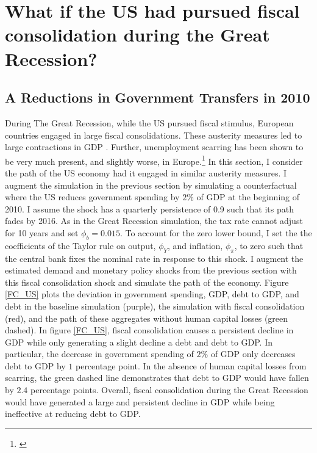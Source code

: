 \section{What if the US had pursued fiscal consolidation during the Great Recession?}


\subsection{A Reductions in Government Transfers in 2010}

During The Great Recession, while the US pursued fiscal stimulus, European countries engaged in large fiscal consolidations. These austerity measures led to large contractions in GDP \citep{Jorda2016,FATAS2018,House2020}. Further, unemployment scarring has been shown to be very much present, and slightly worse, in Europe.\footnote{\cite{Bertheau2023} } In this section, I consider the path of the US economy had it engaged in similar austerity measures. I augment the simulation in the previous section by simulating a counterfactual where the US reduces government spending by $2\%$ of GDP at the beginning of 2010. I assume the shock has a quarterly persistence of 0.9 such that its path fades by 2016. As in the Great Recession simulation, the tax rate cannot adjust for 10 years and set $\phi_{b}=0.015$. To account for the zero lower bound, I set the the coefficients of the Taylor rule on output, $\phi_{Y}$, and inflation, $\phi_{\pi}$, to zero such that the central bank fixes the nominal rate in response to this shock. I augment the estimated demand and monetary policy shocks from the previous section with this fiscal consolidation shock and simulate the path of the economy. Figure \ref{FC_US} plots the deviation in government spending, GDP, debt to GDP, and debt in the baseline simulation (purple), the simulation with fiscal consolidation (red), and the path of these aggregates without human capital losses (green dashed). In figure \ref{FC_US}, fiscal consolidation causes a persistent decline in GDP while only generating a slight decline a debt and debt to GDP. In particular, the decrease in government spending of  $2\%$ of GDP only decreases debt to GDP by $1$ percentage point. In the absence of human capital losses from scarring, the green dashed line demonstrates that debt to GDP would have fallen by $2.4$ percentage points. Overall, fiscal consolidation during the Great Recession would have generated a large and persistent decline in GDP while being ineffective at reducing debt to GDP.


